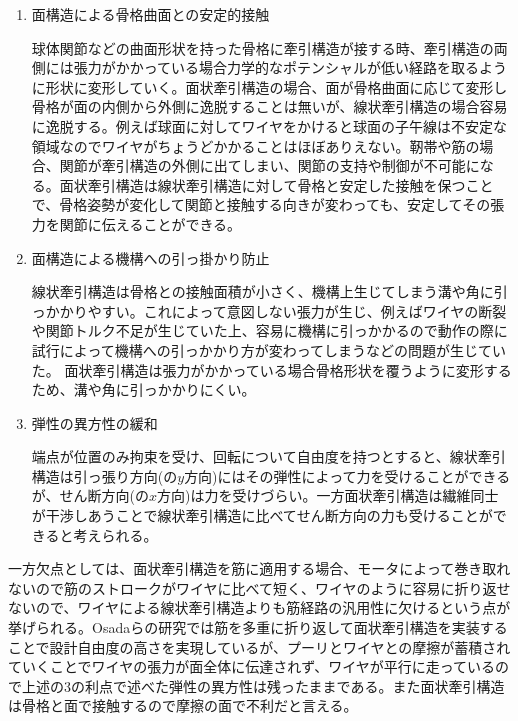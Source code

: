 \documentclass{jarticle}
\begin{document}
\begin{enumerate}
\item 面構造による骨格曲面との安定的接触

  球体関節などの曲面形状を持った骨格に牽引構造が接する時、牽引構造の両側には張力がかかっている場合力学的なポテンシャルが低い経路を取るように形状に変形していく。面状牽引構造の場合、面が骨格曲面に応じて変形し骨格が面の内側から外側に逸脱することは無いが、線状牽引構造の場合容易に逸脱する。例えば球面に対してワイヤをかけると球面の子午線は不安定な領域なのでワイヤがちょうどかかることはほぼありえない。靭帯や筋の場合、関節が牽引構造の外側に出てしまい、関節の支持や制御が不可能になる\cite{Humanoids2011:osada:planar}。面状牽引構造は線状牽引構造に対して骨格と安定した接触を保つことで、骨格姿勢が変化して関節と接触する向きが変わっても、安定してその張力を関節に伝えることができる。

\item 面構造による機構への引っ掛かり防止

  線状牽引構造は骨格との接触面積が小さく、機構上生じてしまう溝や角に引っかかりやすい。これによって意図しない張力が生じ、例えばワイヤの断裂や関節トルク不足が生じていた上、容易に機構に引っかかるので動作の際に試行によって機構への引っかかり方が変わってしまうなどの問題が生じていた。
  面状牽引構造は張力がかかっている場合骨格形状を覆うように変形するため、溝や角に引っかかりにくい。

\item 弾性の異方性の緩和

  端点が位置のみ拘束を受け、回転について自由度を持つとすると、線状牽引構造は引っ張り方向(の${y}$方向)にはその弾性によって力を受けることができるが、せん断方向(の${x}$方向)は力を受けづらい。一方面状牽引構造は繊維同士が干渉しあうことで線状牽引構造に比べてせん断方向の力も受けることができると考えられる。

\end{enumerate}

一方欠点としては、面状牽引構造を筋に適用する場合、モータによって巻き取れないので筋のストロークがワイヤに比べて短く、ワイヤのように容易に折り返せないので、ワイヤによる線状牽引構造よりも筋経路の汎用性に欠けるという点が挙げられる。Osadaらの研究\cite{Humanoids2011:osada:planar}では筋を多重に折り返して面状牽引構造を実装することで設計自由度の高さを実現しているが、プーリとワイヤとの摩擦が蓄積されていくことでワイヤの張力が面全体に伝達されず、ワイヤが平行に走っているので上述の3の利点で述べた弾性の異方性は残ったままである。また面状牽引構造は骨格と面で接触するので摩擦の面で不利だと言える。
\end{document}
